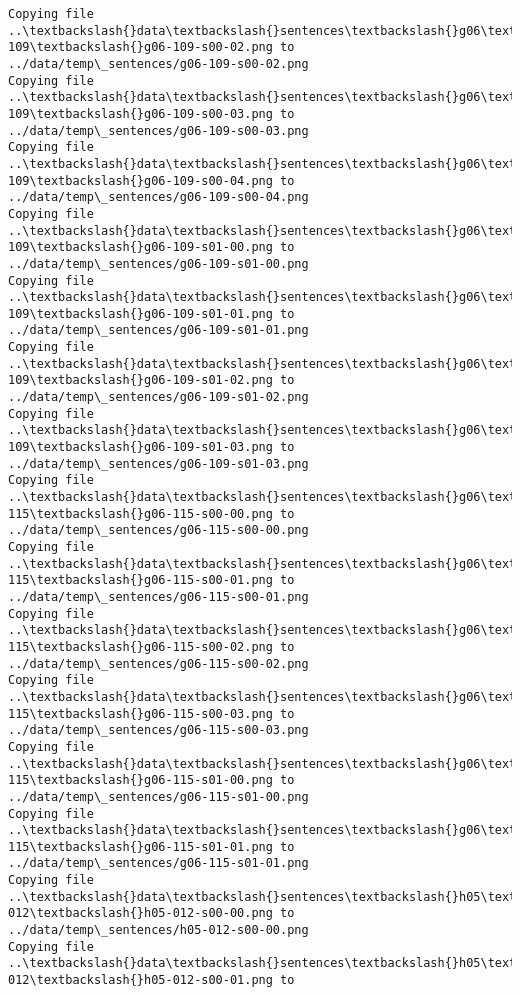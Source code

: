 \documentclass[11pt]{article}
\begin{document}
\begin{Verbatim}[commandchars=\\\{\}]
Copying file ..\textbackslash{}data\textbackslash{}sentences\textbackslash{}g06\textbackslash{}g06-109\textbackslash{}g06-109-s00-02.png to
../data/temp\_sentences/g06-109-s00-02.png
Copying file ..\textbackslash{}data\textbackslash{}sentences\textbackslash{}g06\textbackslash{}g06-109\textbackslash{}g06-109-s00-03.png to
../data/temp\_sentences/g06-109-s00-03.png
Copying file ..\textbackslash{}data\textbackslash{}sentences\textbackslash{}g06\textbackslash{}g06-109\textbackslash{}g06-109-s00-04.png to
../data/temp\_sentences/g06-109-s00-04.png
Copying file ..\textbackslash{}data\textbackslash{}sentences\textbackslash{}g06\textbackslash{}g06-109\textbackslash{}g06-109-s01-00.png to
../data/temp\_sentences/g06-109-s01-00.png
Copying file ..\textbackslash{}data\textbackslash{}sentences\textbackslash{}g06\textbackslash{}g06-109\textbackslash{}g06-109-s01-01.png to
../data/temp\_sentences/g06-109-s01-01.png
Copying file ..\textbackslash{}data\textbackslash{}sentences\textbackslash{}g06\textbackslash{}g06-109\textbackslash{}g06-109-s01-02.png to
../data/temp\_sentences/g06-109-s01-02.png
Copying file ..\textbackslash{}data\textbackslash{}sentences\textbackslash{}g06\textbackslash{}g06-109\textbackslash{}g06-109-s01-03.png to
../data/temp\_sentences/g06-109-s01-03.png
Copying file ..\textbackslash{}data\textbackslash{}sentences\textbackslash{}g06\textbackslash{}g06-115\textbackslash{}g06-115-s00-00.png to
../data/temp\_sentences/g06-115-s00-00.png
Copying file ..\textbackslash{}data\textbackslash{}sentences\textbackslash{}g06\textbackslash{}g06-115\textbackslash{}g06-115-s00-01.png to
../data/temp\_sentences/g06-115-s00-01.png
Copying file ..\textbackslash{}data\textbackslash{}sentences\textbackslash{}g06\textbackslash{}g06-115\textbackslash{}g06-115-s00-02.png to
../data/temp\_sentences/g06-115-s00-02.png
Copying file ..\textbackslash{}data\textbackslash{}sentences\textbackslash{}g06\textbackslash{}g06-115\textbackslash{}g06-115-s00-03.png to
../data/temp\_sentences/g06-115-s00-03.png
Copying file ..\textbackslash{}data\textbackslash{}sentences\textbackslash{}g06\textbackslash{}g06-115\textbackslash{}g06-115-s01-00.png to
../data/temp\_sentences/g06-115-s01-00.png
Copying file ..\textbackslash{}data\textbackslash{}sentences\textbackslash{}g06\textbackslash{}g06-115\textbackslash{}g06-115-s01-01.png to
../data/temp\_sentences/g06-115-s01-01.png
Copying file ..\textbackslash{}data\textbackslash{}sentences\textbackslash{}h05\textbackslash{}h05-012\textbackslash{}h05-012-s00-00.png to
../data/temp\_sentences/h05-012-s00-00.png
Copying file ..\textbackslash{}data\textbackslash{}sentences\textbackslash{}h05\textbackslash{}h05-012\textbackslash{}h05-012-s00-01.png to

\end{Verbatim}
\end{document}

